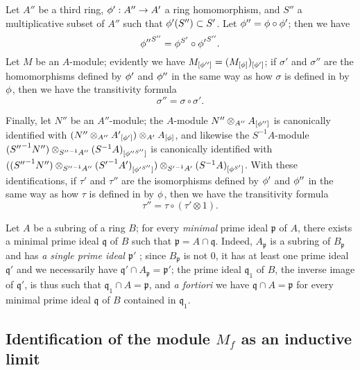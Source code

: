 \begin{env}[1.5.7]
\label{0.1.5.7}
Let $A''$ be a third ring, $\vphi':A''\to A'$ a ring homomorphism, and $S''$ a multiplicative subset of $A''$ such that $\phi'(S'')\subset S'$.
Let $\phi''=\phi\circ\phi'$; then we have
\[
  {\phi''}^{S''}=\phi^{S'}\circ{\phi'}^{S''}.
\]
Let $M$ be an $A$-module; evidently we have $M_{[\phi'']}=(M_{[\phi]})_{[\phi']}$; if $\sigma'$ and $\sigma''$ are the homomorphisms defined by $\phi'$ and $\phi''$ in the same way as how $\sigma$ is defined in  by $\phi$, then we have the transitivity formula
\[
  \sigma''=\sigma\circ\sigma'.
\]

Finally, let $N''$ be an $A''$-module; the $A$-module $N''\otimes_{A''}A_{[\phi'']}$ is canonically identified with $(N''\otimes_{A''}{A'}_{[\phi']})\otimes_{A'}A_{[\phi]}$, and likewise the $S^{-1}A$-module $({S''}^{-1}N'')\otimes_{{S''}^{-1}A''}(S^{-1}A)_{[{\phi''}^{S''}]}$ is canonically identified with $(({S''}^{-1}N'')\otimes_{{S''}^{-1}A''}({S'}^{-1}A')_{[{\phi'}^{S''}]})
  \otimes_{{S'}^{-1}A'}(S^{-1}A)_{[\phi^{S'}]}$.
With these identifications, if $\tau'$ and $\tau''$ are the isomorphisms defined by $\phi'$ and $\phi''$ in the same way as how $\tau$ is defined in  by $\phi$, then we have the transitivity formula
\[
  \tau''=\tau\circ(\tau'\otimes 1).
\]
\end{env}

\begin{env}[1.5.8]
\label{0.1.5.8}
Let $A$ be a subring of a ring $B$; for every \emph{minimal} prime ideal $\mathfrak{p}$ of $A$, there exists a minimal prime ideal $\mathfrak{q}$ of $B$ such that $\mathfrak{p}=A\cap\mathfrak{q}$.
Indeed, $A_\mathfrak{p}$ is a subring of $B_\mathfrak{p}$  and has \emph{a single prime ideal $\mathfrak{p}'$} ; since $B_\mathfrak{p}$ is not $0$, it has at least one prime ideal $\mathfrak{q}'$ and we necessarily have $\mathfrak{q}'\cap A_\mathfrak{p}=\mathfrak{p}'$; the prime ideal $\mathfrak{q}_1$ of $B$, the inverse image of $\mathfrak{q}'$, is thus such that $\mathfrak{q}_1\cap A=\mathfrak{p}$, and \emph{a fortiori} we have $\mathfrak{q}\cap A=\mathfrak{p}$ for every minimal prime ideal $\mathfrak{q}$ of $B$ contained in $\mathfrak{q}_1$.
\end{env}

\subsection{Identification of the module $M_f$ as an inductive limit}
\label{subsection:0.1.6}

